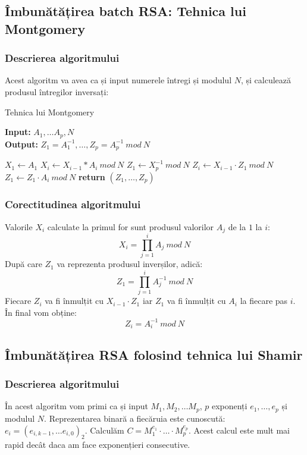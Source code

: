 \documentclass[12pt, oneside]{book}
\begin{document}
		  \subsection{Îmbunătățirea batch RSA: Tehnica lui Montgomery}
		
		
		
		
		
		
		  \subsubsection{Descrierea algoritmului}
		  Acest algoritm va avea ca și input numerele întregi și modulul $N$, și calculează produsul întregilor inversați:  
		  \begin{algorithm}[H]
		   \caption{Tehnica lui Montgomery}
		   \textbf{Input:} $A_1, \dots A_p,N$ \\
		   \textbf{Output:} $Z_1=A_{1}^{-1}, \dots ,Z_p=A_{p}^{-1} \ mod \ N$
		   \begin{algorithmic}
		   	\State $X_1 \gets A_1$
		   	\State $X_i \gets X_{i-1}*A_i \ mod \ N$
		   	\EndFor
		   	\State $Z_1 \gets X_{p}^{-1} \ mod \ N$
		   		\State $Z_i \gets X_{i-1} \cdot   Z_1 \ mod \ N$
		   		\State $Z_1 \gets Z_1 \cdot   A_i \ mod \ N$
		   		\State
		   	\EndFor
		   	\State \textbf{return} $(Z_1, \dots ,Z_p)$ 
		   \end{algorithmic}
		   \end{algorithm}
		   
		   \subsubsection{Corectitudinea algoritmului}
		   Valorile $X_i$ calculate la primul for sunt produsul valorilor $A_j$ de la $1$ la $i$:
		   $$ X_i=\prod_{j=1}^{i} A_j \ mod \ N$$
		   După care $Z_1$ va reprezenta produsul inverșilor, adică:
		   $$Z_1=\prod_{j=1}^{i} A_{j}^{-1} \ mod \ N$$
		   Fiecare $Z_i$ va fi înmulțit cu $X_{i-1} \cdot   Z_1$ iar $Z_1$ va fi înmulțit cu $A_i$ la fiecare pas $i$. În final vom obține:
		   $$Z_i=A_{i}^{-1} \ mod \ N$$ 
		   \subsection{Îmbunătățirea RSA folosind tehnica lui Shamir}
		   \subsubsection{Descrierea algoritmului}
		   În acest algoritm vom primi ca și input $M_1,M_2, \dots M_p$, $p$ exponenți $e_1, \dots ,e_p$ și modulul $N$. Reprezentarea binară a fiecăruia este cunoscută: $e_i=(e_{i,k-1}, \dots e_{i,0})_2$. Calculăm $C=M_{1}^{e_1} \cdot \dots  \cdot M_{p}^{e_p}$. Acest calcul este mult mai rapid decât daca am face exponențieri consecutive.
\end{document}
